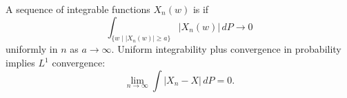 A sequence of integrable functions $X_n(w)$ is  if
$$\int_{\{w \mid |X_n(w)| \geq a\}} |X_n(w)| \, dP \to 0$$
uniformly in $n$ as $a \to \infty$. Uniform integrability plus convergence in probability implies $L^1$ convergence:
$$\lim_{n \to \infty} \int |X_n - X| \, dP = 0.$$
